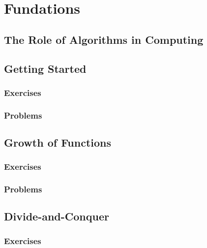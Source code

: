 \documentclass[a4paper, 11pt, fleqn]{report}
\begin{document}
    \tableofcontents
    \part{Fundations}
        \chapter{The Role of Algorithms in Computing}

        \chapter{Getting Started}
            \section*{Exercises}
                
                
                
            \section*{Problems}
                
                
                
                
        \chapter{Growth of Functions}
            \section*{Exercises}
                
                
            \section*{Problems}
                
                
        \chapter{Divide-and-Conquer}
            \section*{Exercises}
                
                
\end{document}
